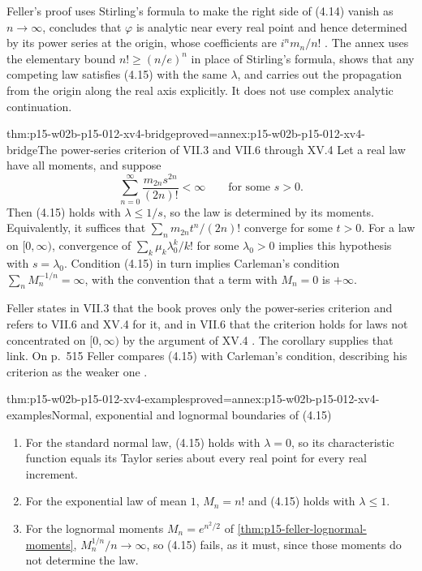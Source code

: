 Feller's proof uses Stirling's formula to make the right side of (4.14)
vanish as \(n\to\infty\), concludes that \(\varphi\) is analytic near every
real point and hence determined by its power series at the origin, whose
coefficients are \(i^nm_n/n!\)
\cite[vol.~II, XV.4, p.~514]{Feller1971ProbabilityII}. The annex uses the
elementary bound \(n!\geq(n/e)^n\) in place of Stirling's formula, shows that
any competing law satisfies (4.15) with the same \(\lambda\), and carries out
the propagation from the origin along the real axis explicitly. It does not
use complex analytic continuation.

\begin{hbcorollary}{thm:p15-w02b-p15-012-xv4-bridge}{proved=annex:p15-w02b-p15-012-xv4-bridge}{The power-series criterion of VII.3 and VII.6 through XV.4}
Let a real law have all moments, and suppose
\[
 \sum_{n=0}^\infty\frac{m_{2n}s^{2n}}{(2n)!}<\infty
 \qquad\text{for some }s>0 .
\]
Then (4.15) holds with \(\lambda\leq1/s\), so the law is determined by its
moments. Equivalently, it suffices that \(\sum_n m_{2n}t^n/(2n)!\) converge
for some \(t>0\). For a law on \([0,\infty)\), convergence of
\(\sum_k\mu_k\lambda_0^k/k!\) for some \(\lambda_0>0\) implies this hypothesis
with \(s=\lambda_0\).
Condition (4.15) in turn implies Carleman's condition
\(\sum_nM_n^{-1/n}=\infty\), with the convention that a term with
\(M_n=0\) is \(+\infty\).
\end{hbcorollary}

Feller states in VII.3 that the book proves only the power-series criterion
and refers to VII.6 and XV.4 for it, and in VII.6 that the criterion holds for
laws not concentrated on \([0,\infty)\) by the argument of XV.4
\cite[vol.~II, VII.3, p.~228; VII.6, p.~234]{Feller1971ProbabilityII}.
The corollary supplies that link. On p.~515 Feller compares (4.15) with
Carleman's condition, describing his criterion as the weaker one
\cite[vol.~II, XV.4, p.~515]{Feller1971ProbabilityII}.

\begin{hbtheorem}{thm:p15-w02b-p15-012-xv4-examples}{proved=annex:p15-w02b-p15-012-xv4-examples}{Normal, exponential and lognormal boundaries of (4.15)}
\begin{enumerate}
\item For the standard normal law, (4.15) holds with \(\lambda=0\), so its
      characteristic function equals its Taylor series about every real
      point for every real increment.
\item For the exponential law of mean \(1\), \(M_n=n!\) and (4.15) holds with
      \(\lambda\leq1\).
\item For the lognormal moments \(M_n=e^{n^2/2}\) of
      \cref{thm:p15-feller-lognormal-moments}, \(M_n^{1/n}/n\to\infty\), so
      (4.15) fails, as it must, since those moments do not determine the law.
\end{enumerate}
\end{hbtheorem}

